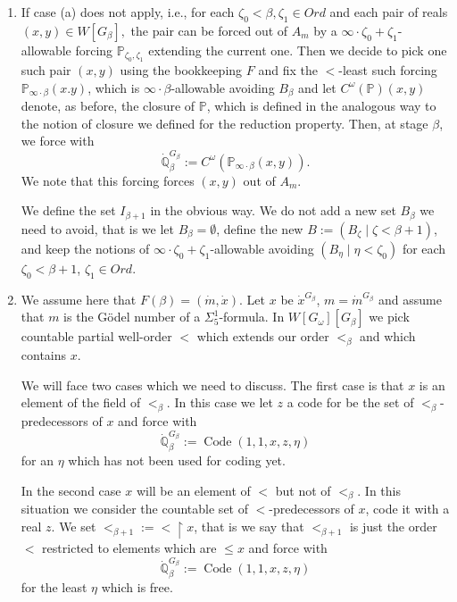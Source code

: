 \documentclass[a4paper,11pt]{article}
\newcommand{\forceP}{\mathbb{P}}
\newcommand{\forceQ}{\mathbb{Q}}
\begin{document}
\begin{enumerate}
\item[(b)] If case (a) does not apply, i.e., for each \( \zeta_0 < \beta,\zeta_1 \in Ord \) and each pair of reals $(x,y) \in W[G_{\beta}],$ the pair can be forced out of \( A_m \) by a \( \infty \cdot\zeta_0 +\zeta_1 \)-allowable forcing $\forceP_{\zeta_0,\zeta_1}$ extending the current one.
Then we decide to pick one such pair $(x,y)$ using the bookkeeping $F$ and fix the $<$-least such forcing $\forceP_{\infty \cdot \beta} (x.y)$, which is $\infty \cdot \beta$-allowable avoiding $B_{\beta}$
and let $C^{\omega}( \forceP)(x,y)$ denote, as before, the closure of $\forceP$, which is defined in the analogous way to the notion of closure we defined for the reduction property.
Then, at stage $\beta$, we force with
\[ \dot{\forceQ}_{\beta}^{G_{\beta}}:= C^{\omega} (\forceP_{\infty \cdot \beta}(x,y)).\]
We note that this forcing forces $(x,y)$ out of $A_m$.

We define the set $I_{\beta+1}$ in the obvious way. 
We do not add a new set $B_{\beta}$ we need to avoid, that is we let $B_{\beta}= \emptyset$, define the new 
$B:= (B_{\zeta} \mid \zeta < \beta+1)$, and keep the notions of $\infty \cdot \zeta_0 + \zeta_1$-allowable avoiding $(B_{\eta} \mid \eta < \zeta_0)$ for each $\zeta_0 < \beta+1$, $\zeta_1 \in Ord$.

\item[(c)] We assume here that $F(\beta)=(\dot{m},\dot{x})$. Let $x$ be $\dot{x}^{G_{\beta}}$, $m= \dot{m}^{G_{\beta}}$ and assume that $m$ is the G\"odel number of a $\Sigma^1_5$-formula.  In $W[G_{\omega}][G_{\beta}]$ we pick countable partial well-order $<$ which extends our order $<_{\beta}$ and which contains $x$.

We will face two cases which we need to discuss. The first case is that $x$ is an element of the field of $<_{\beta}$. In this case we let $z$ a code for be the set of $<_{\beta}$-predecessors of $x$ and force with
\[ \dot{\forceQ}_{\beta}^{G_{\beta}} := \operatorname{Code} (1,1,x,z,\eta) \]
for an $\eta$ which has not been used for coding yet.

In the second case $x$ will be an element of $<$ but not of $<_{\beta}$. In this situation we consider the countable set of $<$-predecessors of $x$, code it with a real $z$. We set $<_{\beta+1} := < \upharpoonright x$, that  is  we say that $<_{\beta+1}$ is just the order $<$ restricted to elements which are $\le x$  and
force with
\[ \dot{\forceQ}_{\beta}^{G_{\beta}}:= \operatorname{Code} (1,1,x,z,\eta) \]
for the least $\eta$ which is free.


\end{enumerate}
\end{document}
